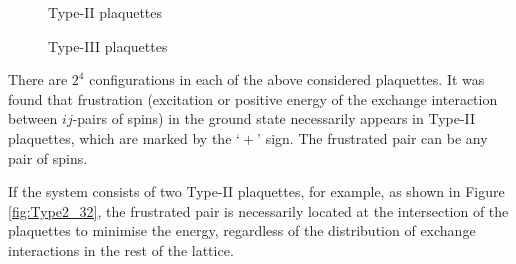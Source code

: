 \documentclass[preprint,12pt]{elsarticle}
\begin{document}
\begin{figure}[H]
\begin{minipage}{0.3\textwidth}
		\caption{Type-II plaquettes}
		\label{fig:Type2}
	\end{minipage}
	\hspace{5pt}
	\begin{minipage}{0.3\textwidth}
		\centering
		\hspace{-4pt} 
		\caption{Type-III plaquettes}
		\label{fig:Type3}
	\end{minipage}
\end{figure}


There are $2^4$ configurations in each of the above considered plaquettes.
It was found that frustration (excitation or positive energy of the exchange interaction between $ij$-pairs of spins) in the ground state necessarily appears in Type-II plaquettes, which are marked by the $‘+’$ sign. The frustrated pair can be any pair of spins.


If the system consists of two Type-II plaquettes, for example, as shown in Figure \ref{fig:Type2_32}, the frustrated pair is necessarily located at the intersection of the plaquettes to minimise the energy, regardless of the distribution of exchange interactions in the rest of the lattice. 
\end{document}
